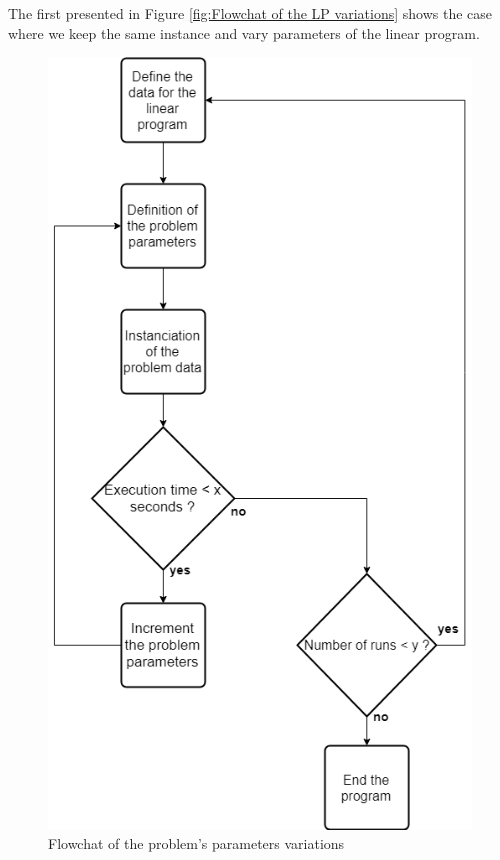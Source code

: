 \documentclass[12pt, a4paper,twoside]{memoir}
\begin{document}
	\noindent The first presented in Figure \ref{fig:Flowchat of the LP variations} shows the case where we keep the same instance and vary parameters of the linear program. 
	
	\begin{figure}[H]
		\centering
		\begin{flushleft}
			\includegraphics[scale=0.6]{img/i_flowchartpbvariation.png}
		\end{flushleft}
		\caption{Flowchat of the problem's parameters variations}
		\label{fig:Flowchat of the problem's parameters variations}
	\end{figure}
	
\end{document}
